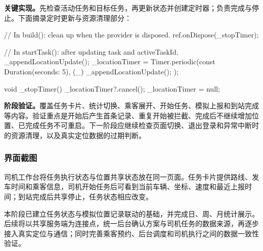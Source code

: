 \noindent\textbf{关键实现。}先检查活动任务和目标任务，再更新状态并创建定时器；负责完成与停止。下面摘录定时更新与资源清理部分：
\begin{source}
// In build(): clean up when the provider is disposed.
ref.onDispose(_stopTimer);

// In startTask(): after updating task and activeTaskId.
_appendLocationUpdate();
_locationTimer = Timer.periodic(const Duration(seconds: 5), (_) {
  _appendLocationUpdate();
});

void _stopTimer() {
  _locationTimer?.cancel();
  _locationTimer = null;
}
\end{source}
\noindent\textbf{阶段验证。}覆盖任务卡片、统计切换、乘客展开、开始任务、模拟上报和到站完成等内容。验证重点是开始后产生首条记录、重复开始被拦截、完成后不继续增加位置、已完成任务不可重启。下一阶段应继续检查页面切换、退出登录和异常中断时的资源清理，以及真实定位数据的过期判断。

\clearpage
\subsubsection{界面截图}

司机工作台将任务执行状态与位置共享状态放在同一页面。任务卡片提供路线、发车时间和乘客信息，司机开始任务后可看到当前车辆、坐标、速度和最近上报时间；到站完成后共享停止，任务状态相应改变。

本阶段已建立任务状态与模拟位置记录联动的基础，并完成日、周、月统计展示。后续将以共享服务端为连接点，统一后台确认方案与司机任务的数据来源，再逐步接入真实定位与通信；同时完善乘客预约、后台调度和司机执行之间的数据一致性验证。
